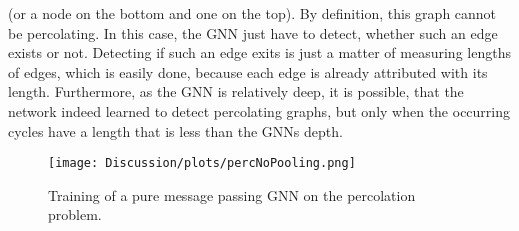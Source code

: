 (or a node on the bottom and one on the top). By definition, this graph cannot be percolating. 
In this case, the GNN just have to detect, whether such an edge exists or not.
Detecting if such an edge exits is just a matter of measuring lengths of edges, which is easily done,
because each edge is already attributed with its length. 
Furthermore, as the GNN is relatively deep, it is possible, that the network indeed learned to detect percolating graphs, but only when the occurring cycles
have a length that is less than the GNNs depth.
\begin{figure}[h]
    \centering
    \texttt{[image: Discussion/plots/percNoPooling.png]}
    \caption{Training of a pure message passing GNN on the percolation problem.}
    \label{fig:trainingPerc}
\end{figure}

